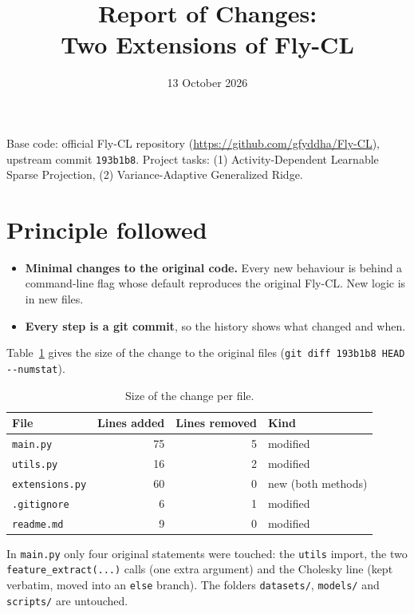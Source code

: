 \documentclass[11pt,a4paper]{article}
\title{Report of Changes:\\ Two Extensions of Fly-CL}
\author{}
\date{13 October 2026}
\begin{document}
\maketitle

\noindent Base code: official Fly-CL repository (\url{https://github.com/gfyddha/Fly-CL}),
upstream commit \texttt{193b1b8}.
Project tasks: (1) Activity-Dependent Learnable Sparse Projection,
(2) Variance-Adaptive Generalized Ridge.

\section{Principle followed}

\begin{itemize}
  \item \textbf{Minimal changes to the original code.} Every new behaviour is behind a
        command-line flag whose default reproduces the original Fly-CL. New logic is in new files.
  \item \textbf{Every step is a git commit}, so the history shows what changed and when.
\end{itemize}

Table~\ref{tab:size} gives the size of the change to the original files
(\texttt{git diff 193b1b8 HEAD -{}-numstat}).

\begin{table}[h]
\centering
\caption{Size of the change per file.}
\label{tab:size}
\begin{tabular}{lrrl}
\toprule
File & Lines added & Lines removed & Kind \\
\midrule
\texttt{main.py}       & 75 & 5 & modified \\
\texttt{utils.py}      & 16 & 2 & modified \\
\texttt{extensions.py} & 60 & 0 & new (both methods) \\
\texttt{.gitignore}    & 6  & 1 & modified \\
\texttt{readme.md}     & 9  & 0 & modified \\
\bottomrule
\end{tabular}
\end{table}

In \texttt{main.py} only four original statements were touched: the \texttt{utils} import, the two
\texttt{feature\_extract(...)} calls (one extra argument) and the Cholesky line (kept verbatim,
moved into an \texttt{else} branch). The folders \texttt{datasets/}, \texttt{models/} and
\texttt{scripts/} are untouched.
\end{document}
